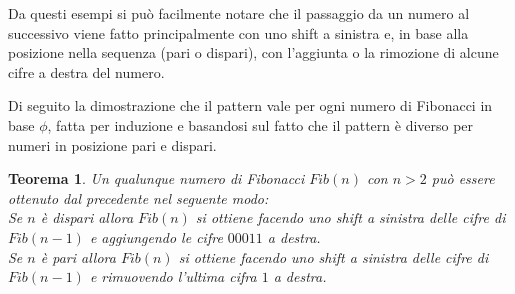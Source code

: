\documentclass[Lau]{sapthesis}
\newtheorem{theorem}{Teorema}
\begin{document}
Da questi esempi si può facilmente notare che il passaggio da un numero al successivo viene fatto principalmente con uno shift a sinistra e, in base alla posizione nella sequenza (pari o dispari), con l'aggiunta o la rimozione di alcune cifre a destra del numero.

\medskip

Di seguito la dimostrazione che il pattern vale per ogni numero di Fibonacci in base $\phi$, fatta per induzione e basandosi sul fatto che il pattern è diverso per numeri in posizione pari e dispari.
\begin{theorem}
Un qualunque numero di Fibonacci $Fib(n)$ con $n>2$ può essere ottenuto dal precedente nel seguente modo:\\
Se $n$ è dispari allora $Fib(n)$ si ottiene facendo uno shift a sinistra delle cifre di $Fib(n-1)$ e aggiungendo le cifre $00011$ a destra.\\
Se $n$ è pari allora $Fib(n)$ si ottiene facendo uno shift a sinistra delle cifre di $Fib(n-1)$ e rimuovendo l'ultima cifra $1$ a destra.\\
\end{theorem}
\end{document}
